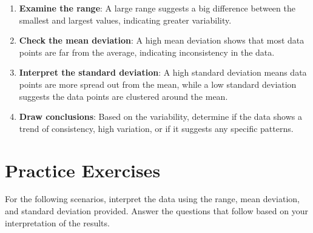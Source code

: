 \begin{enumerate}
    \item \textbf{Examine the range}: A large range suggests a big difference between the smallest and largest values, indicating greater variability.
    \item \textbf{Check the mean deviation}: A high mean deviation shows that most data points are far from the average, indicating inconsistency in the data.
    \item \textbf{Interpret the standard deviation}: A high standard deviation means data points are more spread out from the mean, while a low standard deviation suggests the data points are clustered around the mean.
    \item \textbf{Draw conclusions}: Based on the variability, determine if the data shows a trend of consistency, high variation, or if it suggests any specific patterns.
\end{enumerate}

\section*{Practice Exercises}

For the following scenarios, interpret the data using the range, mean deviation, and standard deviation provided. Answer the questions that follow based on your interpretation of the results.

